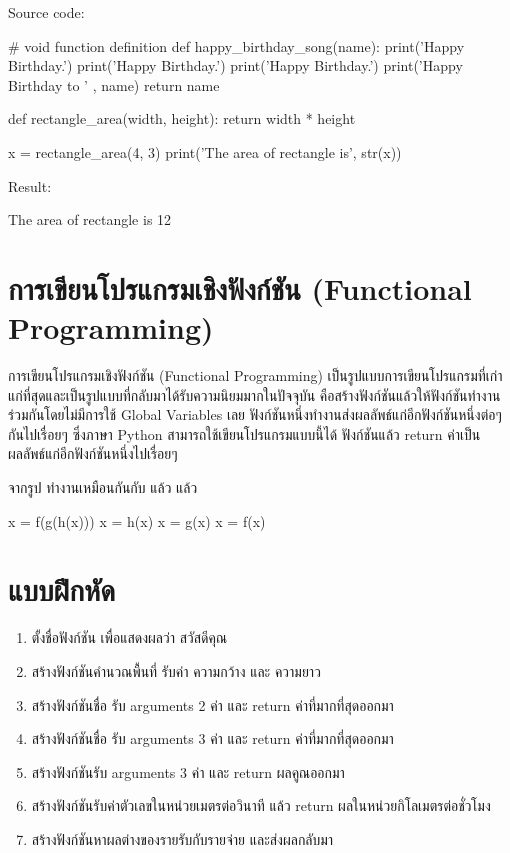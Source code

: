 Source code:
\begin{codelist}{}{}
# void function definition
def happy_birthday_song(name):
    print('Happy Birthday.')
    print('Happy Birthday.')
    print('Happy Birthday.')
    print('Happy Birthday to ' , name)
    return name

def rectangle_area(width, height):
    return width * height
    
x = rectangle_area(4, 3)
print('The area of rectangle is', str(x))
\end{codelist}

Result:
\begin{codelist}{}{}
The area of rectangle is 12
\end{codelist}


\section{การเขียนโปรแกรมเชิงฟังก์ชัน (Functional Programming)}


การเขียนโปรแกรมเชิงฟังก์ชัน (Functional Programming) เป็นรูปแบบการเขียนโปรแกรมที่เก่าแก่ที่สุดและเป็นรูปแบบที่กลับมาได้รับความนิยมมากในปัจจุบัน คือสร้างฟังก์ชันแล้วให้ฟังก์ชันทำงานร่วมกันโดยไม่มีการใช้ Global Variables เลย ฟังก์ชันหนึ่งทำงานส่งผลลัพธ์แก่อีกฟังก์ชันหนึ่งต่อๆ กันไปเรื่อยๆ ซึ่งภาษา Python สามารถใช้เขียนโปรแกรมแบบนี้ได้ ฟังก์ชันแล้ว return ค่าเป็นผลลัพธ์แก่อีกฟังก์ชันหนึ่งไปเรื่อยๆ  

จากรูป   ทำงานเหมือนกันกับ  แล้ว   แล้ว  

\begin{codelist}{}{}
x = f(g(h(x)))
x = h(x)
x = g(x)
x = f(x)
\end{codelist}


\section{แบบฝึกหัด}

\begin{enumerate} 

\item ตั้งชื่อฟังก์ชัน  เพื่อแสดงผลว่า สวัสดีคุณ
\item สร้างฟังก์ชันคำนวณพื้นที่ รับค่า ความกว้าง และ ความยาว
\item สร้างฟังก์ชันชื่อ   รับ arguments 2 ค่า และ return ค่าที่มากที่สุดออกมา
\item สร้างฟังก์ชันชื่อ   รับ arguments 3 ค่า และ return ค่าที่มากที่สุดออกมา
\item สร้างฟังก์ชันรับ arguments 3 ค่า และ return ผลคูณออกมา
\item สร้างฟังก์ชันรับค่าตัวเลขในหน่วยเมตรต่อวินาที แล้ว return ผลในหน่วยกิโลเมตรต่อชั่วโมง
\item สร้างฟังก์ชันหาผลต่างของรายรับกับรายจ่าย และส่งผลกลับมา

\end{enumerate}


